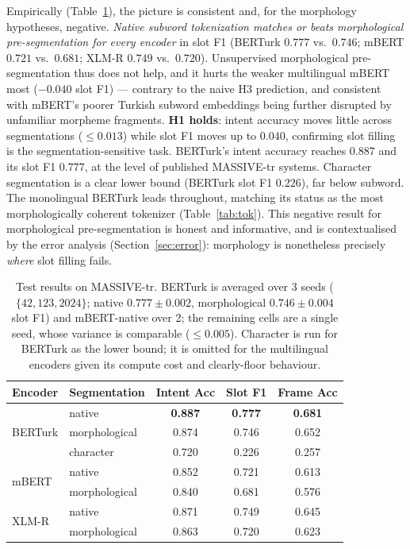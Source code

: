 \documentclass[runningheads]{llncs}
\begin{document}
Empirically (Table~\ref{tab:main}), the picture is consistent and, for the
morphology hypotheses, negative. \emph{Native subword tokenization matches or
beats morphological pre-segmentation for every encoder} in slot F1 (BERTurk
$0.777$ vs.\ $0.746$; mBERT $0.721$ vs.\ $0.681$; XLM-R $0.749$ vs.\ $0.720$).
Unsupervised morphological pre-segmentation thus does not help, and it hurts the
weaker multilingual mBERT most ($-0.040$ slot F1) --- contrary to the naive H3
prediction, and consistent with mBERT's poorer Turkish subword embeddings being
further disrupted by unfamiliar morpheme fragments. \textbf{H1 holds}: intent
accuracy moves little across segmentations ($\leq 0.013$) while slot F1 moves up
to $0.040$, confirming slot filling is the segmentation-sensitive task.
BERTurk's intent accuracy reaches $0.887$ and its slot F1 $0.777$, at the level
of published MASSIVE-tr systems. Character segmentation is a clear lower bound
(BERTurk slot F1 $0.226$), far below subword. The monolingual BERTurk leads throughout, matching its status as the most
morphologically coherent tokenizer (Table~\ref{tab:tok}). This negative result for
morphological pre-segmentation is honest and informative, and is contextualised by
the error analysis (Section~\ref{sec:error}): morphology is nonetheless precisely
\emph{where} slot filling fails.

\begin{table}[t]
\centering
\caption{Test results on MASSIVE-tr. BERTurk is averaged over 3 seeds
($\{42,123,2024\}$; native $0.777\pm0.002$, morphological $0.746\pm0.004$ slot
F1) and mBERT-native over 2; the remaining cells are a single seed, whose
variance is comparable ($\leq 0.005$). Character is run for BERTurk as the lower
bound; it is omitted for the multilingual encoders given its compute cost and
clearly-floor behaviour.}
\label{tab:main}
\begin{tabular}{llccc}
\toprule
Encoder & Segmentation & Intent Acc & Slot F1 & Frame Acc \\
\midrule
\multirow{3}{*}{BERTurk} & native        & \textbf{0.887} & \textbf{0.777} & \textbf{0.681} \\
                         & morphological & 0.874 & 0.746 & 0.652 \\
                         & character     & 0.720 & 0.226 & 0.257 \\
\midrule
\multirow{2}{*}{mBERT}   & native        & 0.852 & 0.721 & 0.613 \\
                         & morphological & 0.840 & 0.681 & 0.576 \\
\midrule
\multirow{2}{*}{XLM-R}   & native        & 0.871 & 0.749 & 0.645 \\
                         & morphological & 0.863 & 0.720 & 0.623 \\
\bottomrule
\end{tabular}
\end{table}
\end{document}
